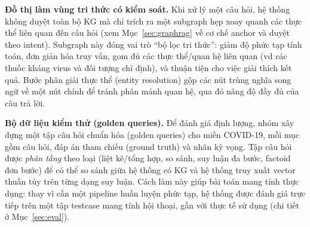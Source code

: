 \documentclass[conference]{IEEEtran}
\begin{document}
\textbf{Đồ thị làm vùng tri thức có kiểm soát.} Khi xử lý một câu hỏi, hệ thống không duyệt toàn bộ KG mà chỉ trích ra một subgraph hẹp xoay quanh các thực thể liên quan đến câu hỏi (xem Mục~\ref{sec:graphrag} về cơ chế anchor và duyệt theo intent). Subgraph này đóng vai trò ``bộ lọc tri thức'': giảm độ phức tạp tính toán, đơn giản hóa truy vấn, gom đủ các thực thể/quan hệ liên quan (vd các thuốc kháng virus và đối tượng chỉ định), và thuận tiện cho việc giải thích kết quả. Bước phân giải thực thể (entity resolution) gộp các nút trùng nghĩa song ngữ về một nút chính để tránh phân mảnh quan hệ, qua đó nâng độ đầy đủ của câu trả lời.

\textbf{Bộ dữ liệu kiểm thử (golden queries).} Để đánh giá định lượng, nhóm xây dựng một tập câu hỏi chuẩn hóa (golden queries) cho miền COVID-19, mỗi mục gồm câu hỏi, đáp án tham chiếu (ground truth) và nhãn kỳ vọng. Tập câu hỏi được \emph{phân tầng} theo loại (liệt kê/tổng hợp, so sánh, suy luận đa bước, factoid đơn bước) để có thể so sánh giữa hệ thống có KG và hệ thống truy xuất vector thuần túy trên từng dạng suy luận. Cách làm này giúp bài toán mang tính thực dụng: thay vì cần một pipeline huấn luyện phức tạp, hệ thống được đánh giá trực tiếp trên một tập testcase mang tính hội thoại, gần với thực tế sử dụng (chi tiết ở Mục~\ref{sec:eval}).
\end{document}
